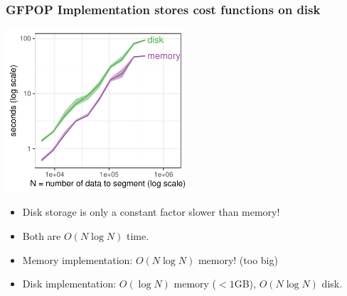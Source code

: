 \documentclass{beamer}
\begin{document}
\begin{frame}
  \frametitle{GFPOP Implementation stores cost functions on disk}

  \includegraphics[width=0.5\textwidth]{jss-figure-disk-memory-compare-speed}

  \begin{itemize}
  \item Disk storage is only a constant factor slower than memory!
  \item Both are $O(N\log N)$ time.
  \item Memory implementation: $O(N \log N)$ memory! (too big)
  \item Disk implementation: $O(\log N)$ memory ($<1$GB), $O(N\log N)$
    disk.
  \end{itemize}

\end{frame}
\end{document}
